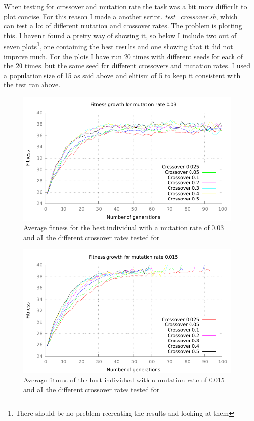 When testing for crossover and mutation rate the task was a bit more difficult
to plot concise. For this reason I made a another script,
\textit{test\_crossover.sh}, which can test a lot of different mutation and
crossover rates. The problem is plotting this. I haven't found a pretty way of
showing it, so below I include two out of seven plots\footnote{There should be
no problem recreating the results and looking at them}, one containing the best
results and one showing that it did not improve much. For the plots I have run
20 times with different seeds for each of the 20 times, but the same seed for
different crossovers and mutation rates. I used a population size of 15 as said
above and elitism of 5 to keep it consistent with the test ran above.

\begin{figure}[h!]
	\includegraphics{../graphs/fitness_crossover_mute_003_average.pdf}
	\caption{Average fitness for the best individual with a mutation rate of 0.03 and all the
	different crossover rates tested for}
	\label{fig:cross 0.03}
\end{figure}

\begin{figure}[h!]
	\includegraphics{../graphs/fitness_crossover_mute_0015_average.pdf}
	\caption{Average fitness of the best individual with a mutation rate of 0.015 and all the
	different crossover rates tested for}
	\label{fig:cross 0.015}
\end{figure}

